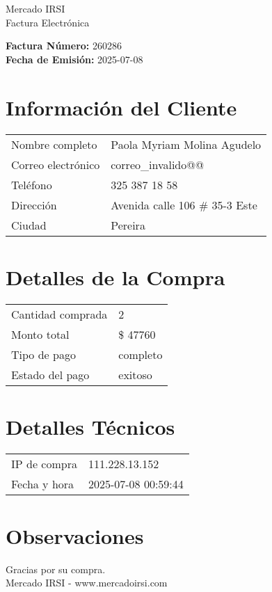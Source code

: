 \documentclass[12pt]{article}
\begin{document}
\begin{center}
    \Huge Mercado IRSI \\
    \Large Factura Electrónica
\end{center}

\vspace{0.5cm}

\noindent \textbf{Factura Número:} 260286 \\
\textbf{Fecha de Emisión:} 2025-07-08

\vspace{0.5cm}

\section*{Información del Cliente}
\begin{longtable}{ll}
Nombre completo & Paola Myriam Molina Agudelo \\
Correo electrónico & correo\_invalido@@ \\
Teléfono & 325 387 18 58 \\
Dirección & Avenida calle 106 \# 35-3 Este \\
Ciudad & Pereira \\
\end{longtable}

\vspace{0.5cm}

\section*{Detalles de la Compra}
\begin{longtable}{ll}
Cantidad comprada & 2 \\
Monto total & \$ 47760 \\
Tipo de pago & completo \\
Estado del pago & exitoso \\
\end{longtable}

\vspace{0.5cm}

\section*{Detalles Técnicos}
\begin{longtable}{ll}
IP de compra & 111.228.13.152 \\
Fecha y hora & 2025-07-08 00:59:44 \\
\end{longtable}

\vspace{0.5cm}

\section*{Observaciones}


\vspace{0.5cm}

\begin{center}
    Gracias por su compra. \\
    Mercado IRSI - www.mercadoirsi.com
\end{center}
\end{document}
